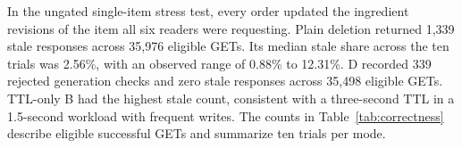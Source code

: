 In the ungated single-item stress test, every order updated the ingredient revisions of the item all six readers were requesting. Plain deletion returned 1{,}339 stale responses across 35{,}976 eligible GETs. Its median stale share across the ten trials was 2.56\%, with an observed range of 0.88\% to 12.31\%. D recorded 339 rejected generation checks and zero stale responses across 35{,}498 eligible GETs. TTL-only B had the highest stale count, consistent with a three-second TTL in a 1.5-second workload with frequent writes. The counts in Table~\ref{tab:correctness} describe eligible successful GETs and summarize ten trials per mode.
